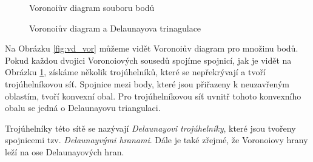\documentclass[12pt,a4paper]{article}
\begin{document}
\begin{figure}[h!]
\centering
\begin{floatrow}
{\caption{Voronoiův diagram souboru bodů}\label{fig:vd_vor}}
{\caption{Voronoiův diagram a Delaunayova trinagulace}\label{fig:vd_del}}
\end{floatrow}
\end{figure}

Na Obrázku \ref{fig:vd_vor} můžeme vidět Voronoiův diagram pro množinu bodů. Pokud každou dvojici Voronoiových sousedů spojíme spojnicí, jak je vidět na Obrázku \ref{fig:vd_del}, získáme několik trojúhelníků, které se nepřekrývají a tvoří trojúhelníkovou síť. Spojnice mezi body, které jsou přiřazeny k neuzavřeným oblastím, tvoří konvexní obal. Pro trojúhelníkovou síť uvnitř tohoto konvexního obalu se jedná o Delaunayovu triangulaci.

Trojúhelníky této sítě se nazývají \emph{Delaunayovi trojúhelníky}, které jsou tvořeny spojnicemi tzv. \emph{Delaunayvými hranami}. Dále je také zřejmé, že Voronoiovy hrany leží na ose Delaunayových hran.


\newpage
\end{document}
